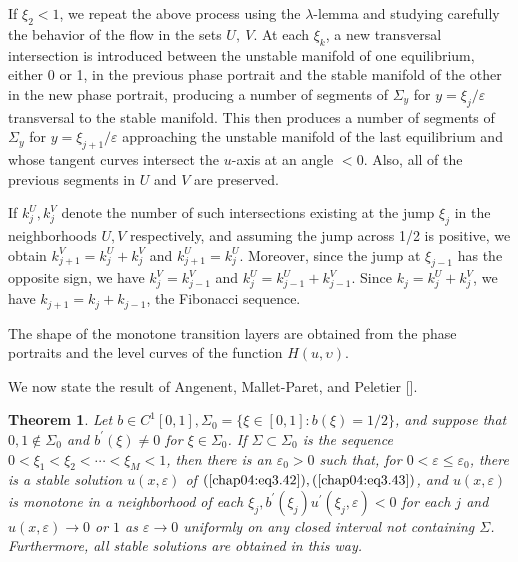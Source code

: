 \documentclass{surv-l}
\theoremstyle{plain}
\newtheorem{theorem}{Theorem}[section]
\theoremstyle{definition}
\numberwithin{equation}{section}
\numberwithin{figure}{chapter}
\begin{document}
If $\xi_{2}<1$, we repeat the above process using the $\lambda$-lemma and studying carefully the behavior of the flow in the sets $U,\ V$. At each $\xi_{k}$, a new transversal intersection is introduced between the unstable manifold of one equilibrium, either $0$ or 1, in the previous phase portrait and the stable manifold of the other in the new phase portrait, producing a number of segments of $\Sigma_{y}$ for $ y=\xi_{j}/\varepsilon$ transversal to the stable manifold. This then produces a number of segments of $\Sigma_{y}$ for $ y=\xi_{j+1}/\varepsilon$ approaching the unstable manifold of the last equilibrium and whose tangent curves intersect the $u$-axis at an angle $<0$. Also, all of the previous segments in $U$ and $V$ are preserved.

If $k_{j}^{U},k_{j}^{V}$ denote the number of such intersections existing at the jump $\xi_{j}$ in the neighborhoods $U,V$ respectively, and assuming the jump across 1/2 is positive, we obtain $k_{j+1}^{V}=k_{j}^{U}+k_{j}^{V}$ and $k_{j+1}^{U}=k_{j}^{U}$. Moreover, since the jump at $\xi_{j-1}$ has the opposite sign, we have $k_{j}^{V}=k_{j-1}^{V}$ and $k_{j}^{U}=k_{j-1}^{U}+k_{j-1}^{V}$. Since $k_{j}=k_{j}^{U}+k_{j}^{V}$, we have $k_{j+1}=k_{j}+k_{j-1}$, the Fibonacci sequence.

The shape of the monotone transition layers are obtained from the phase portraits and the level curves of the function $H(u,\upsilon)$.

We now state the result of Angenent, Mallet-Paret, and Peletier [\citeyear{1987amp}].

\begin{theorem}\label{thm4.3.17} Let $b\in C^{1}[0,1],\Sigma_{0}=\{\xi\in[0,1]\!:b(\xi)=1/2\}$, and suppose that $0,1\not\in\Sigma_{0}$ and $b^{\prime}(\xi)\neq 0$ for $\xi\in\Sigma_{0}$. If $\Sigma\subset\Sigma_{0}$ is the sequence $0<\xi_{1}<\xi_{2}<\cdots <\xi_{M}<1$, then there is an $\varepsilon_{0}>0$ such that, for $0<\varepsilon\leq\varepsilon_{0}$, there is a stable solution $u(x,\varepsilon)$ of $(\ref{chap04:eq3.42}), (\ref{chap04:eq3.43})$, and $u(x,\varepsilon)$ is monotone in a neighborhood of each $\xi_{j},b^{\prime}(\xi_{j})u^{\prime}(\xi_{j},\varepsilon)<0$ for each $j$ and $u(x,\varepsilon)\rightarrow 0$ or $1$ as $\varepsilon \rightarrow 0$ uniformly on any closed interval not containing $\Sigma$. Furthermore, all stable solutions are obtained in this way.
\end{theorem}
\end{document}
